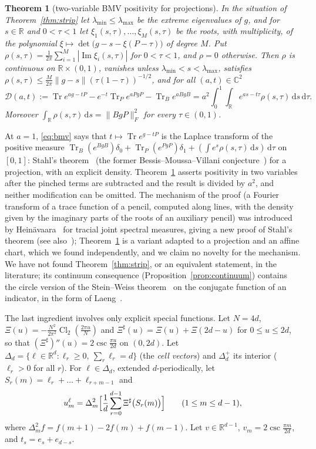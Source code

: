 \documentclass[11pt]{article}
\newtheorem{theorem}{Theorem}
\theoremstyle{remark}
\numberwithin{equation}{section}
\newcommand{\R}{\mathbb{R}}
\newcommand{\C}{\mathbb{C}}
\newcommand{\Tr}{\operatorname{Tr}}
\renewcommand{\Im}{\operatorname{Im}}
\newcommand{\Cl}{\operatorname{Cl}_2}
\newcommand{\cD}{\mathcal{D}}
\newcommand{\Sh}{\Xi^{\sharp}}
\newcommand{\lmin}{\lambda_{\min}}
\newcommand{\lmax}{\lambda_{\max}}
\newcommand{\dd}{\,\mathrm{d}}
\begin{document}
\begin{theorem}[two-variable BMV positivity for projections]\label{thm:bmv}
In the situation of Theorem~\ref{thm:strip} let $\lmin\le\lmax$ be the extreme eigenvalues of $g$, and for $s\in\R$ and
$0<\tau<1$ let $\xi_1(s,\tau),\dots,\xi_M(s,\tau)$ be the roots, with multiplicity, of the polynomial
$\xi\mapsto\det\bigl(g-s-\xi(P-\tau)\bigr)$ of degree $M$. Put $\rho(s,\tau)=\frac1{2\pi}\sum_{i=1}^M|\Im\xi_i(s,\tau)|$
for $0<\tau<1$, and $\rho=0$ otherwise. Then $\rho$ is continuous on $\R\times(0,1)$, vanishes unless $\lmin<s<\lmax$,
satisfies $\rho(s,\tau)\le\frac M{2\pi}\|g-s\|(\tau(1-\tau))^{-1/2}$, and for all $(a,t)\in\C^2$
\begin{equation}\label{eq:bmv}
\cD(a,t):=\Tr e^{ag-tP}-e^{-t}\Tr_Pe^{aPgP}-\Tr_Be^{aBgB}=a^2\int_0^1\!\!\int_\R e^{as-t\tau}\rho(s,\tau)\dd s\dd\tau .
\end{equation}
Moreover $\int_\R\rho(s,\tau)\dd s=\|BgP\|_F^2$ for every $\tau\in(0,1)$.
\end{theorem}

At $a=1$, \eqref{eq:bmv} says that $t\mapsto\Tr e^{g-tP}$ is the Laplace transform of the positive measure
$\Tr_B(e^{BgB})\delta_0+\Tr_P(e^{PgP})\delta_1+(\int e^s\rho(s,\tau)\dd s)\dd\tau$ on $[0,1]$: Stahl's
theorem~\cite{Stahl} (the former Bessis--Moussa--Villani conjecture~\cite{BMV}) for a projection, with an explicit
density. Theorem~\ref{thm:bmv} asserts positivity in two variables after the pinched terms are subtracted and the result
is divided by $a^2$, and neither modification can be omitted. The mechanism of the proof (a Fourier transform of a
trace function of a pencil, computed along lines, with the density given by the imaginary parts of the roots of an
auxiliary pencil) was introduced by Hein\"avaara~\cite{He} for tracial joint spectral measures, giving a new proof of
Stahl's theorem (see also~\cite{Eremenko,LS}); Theorem~\ref{thm:bmv} is a variant adapted to a projection and an affine
chart, which we found independently, and we claim no novelty for the mechanism. We have not found
Theorem~\ref{thm:strip}, or an equivalent statement, in the literature; its continuum consequence
(Proposition~\ref{prop:continuum}) contains the circle version of the Stein--Weiss theorem~\cite{SW} on the conjugate
function of an indicator, in the form of Laeng~\cite{Laeng}.

The last ingredient involves only explicit special functions. Let $N=4d$, $\Xi(u)=-\frac{N^2}{2\pi^2}\Cl(\frac{2\pi
u}N)$ and $\Sh(u)=\Xi(u)+\Xi(2d-u)$ for $0\le u\le2d$, so that $(\Sh)''(u)=2\csc\frac{\pi u}{2d}$ on $(0,2d)$. Let
$\Delta_d=\{\ell\in\R^d:\ell_r\ge0,\ \sum_r\ell_r=d\}$ (the \emph{cell vectors}) and $\Delta_d^+$ its interior
($\ell_r>0$ for all $r$). For $\ell\in\Delta_d$, extended $d$-periodically, let $S_r(m)=\ell_r+\dots+\ell_{r+m-1}$ and
\begin{equation}\label{eq:uell}
u^\ell_m=\Delta^2_m\Bigl[\frac1d\sum_{r=0}^{d-1}\Sh\bigl(S_r(m)\bigr)\Bigr]\qquad(1\le m\le d-1),
\end{equation}
where $\Delta^2_mf=f(m+1)-2f(m)+f(m-1)$. Let $v\in\R^{d-1}$, $v_m=2\csc\frac{\pi m}{2d}$, and $t_s=e_s+e_{d-s}$.
\end{document}
